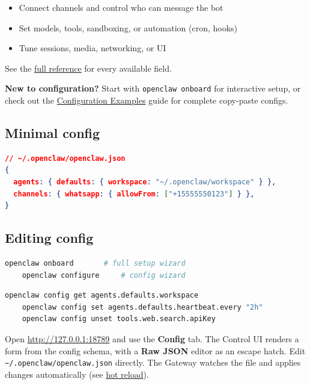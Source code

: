 \begin{itemize}
  \item Connect channels and control who can message the bot
  \item Set models, tools, sandboxing, or automation (cron, hooks)
  \item Tune sessions, media, networking, or UI
\end{itemize}


See the \href{/gateway/configuration-reference}{full reference} for every available field.

\textbf{New to configuration?} Start with \texttt{openclaw onboard} for interactive setup, or check out the \href{/gateway/configuration-examples}{Configuration Examples} guide for complete copy-paste configs.

\subsection{Minimal config}


\begin{lstlisting}[language=json]
// ~/.openclaw/openclaw.json
{
  agents: { defaults: { workspace: "~/.openclaw/workspace" } },
  channels: { whatsapp: { allowFrom: ["+15555550123"] } },
}
\end{lstlisting}


\subsection{Editing config}


\begin{lstlisting}[language=bash]
    openclaw onboard       # full setup wizard
    openclaw configure     # config wizard
\end{lstlisting}

\begin{lstlisting}[language=bash]
    openclaw config get agents.defaults.workspace
    openclaw config set agents.defaults.heartbeat.every "2h"
    openclaw config unset tools.web.search.apiKey
\end{lstlisting}

Open \href{http://127.0.0.1:18789}{http://127.0.0.1:18789} and use the \textbf{Config} tab.
The Control UI renders a form from the config schema, with a \textbf{Raw JSON} editor as an escape hatch.
Edit \texttt{\textasciitilde{}/.openclaw/openclaw.json} directly. The Gateway watches the file and applies changes automatically (see \href{\#config-hot-reload}{hot reload}).

